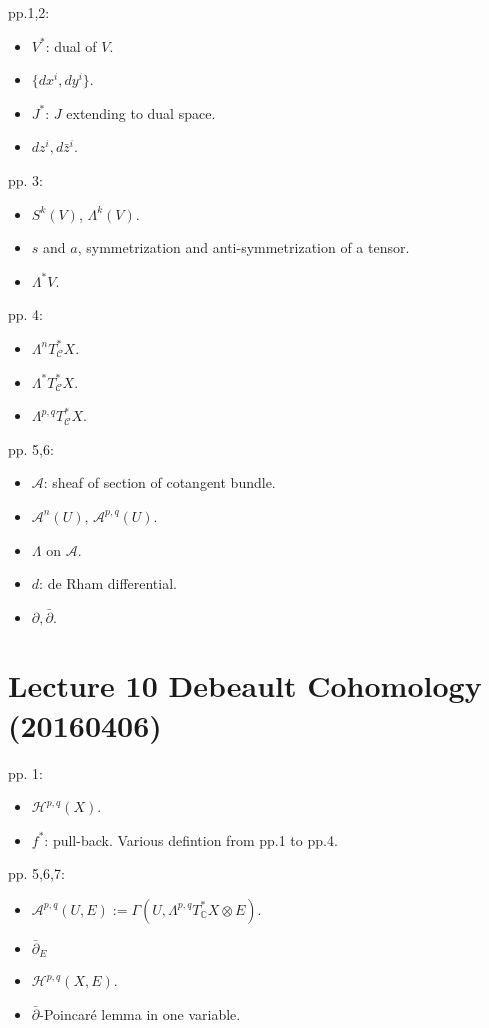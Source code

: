 pp.1,2:
\begin{itemize}
    \item $V^*$: dual of $V$.
    \item $\{dx^i,dy^i\}$.
    \item $J^*$: $J$ extending to dual space.
    \item $dz^i,d\bar{z}^i$.
\end{itemize}
pp. 3:
\begin{itemize}
    \item $S^k(V)$, $\Lambda^k(V)$.
    \item $s$ and $a$, symmetrization and anti-symmetrization of a tensor.
    \item $\Lambda^* V$.
\end{itemize}
pp. 4:
\begin{itemize}
    \item $\Lambda^n T^*_{\mathcal{C}}X$.
    \item $\Lambda^* T^*_{\mathcal{C}}X$.
    \item $\Lambda^{p,q} T^*_{\mathcal{C}}X$.
\end{itemize}
pp. 5,6:
\begin{itemize}
    \item $\mathcal{A}$: sheaf of section of cotangent bundle.
    \item $\mathcal{A}^n(U)$, $\mathcal{A}^{p,q}(U)$.
    \item $\Lambda$ on $\mathcal{A}$.
    \item $d$: de Rham differential.
    \item $\partial, \bar{\partial}$.
\end{itemize}
	
\section{Lecture 10 Debeault Cohomology (20160406)}

pp. 1:
\begin{itemize}
    \item $\mathcal{H}^{p,q}(X)$.
    \item $f^*$: pull-back. Various defintion from pp.1 to pp.4.
\end{itemize}
pp. 5,6,7:
\begin{itemize}
    \item $\mathcal{A}^{p,q}(U,E):=\Gamma(U,\Lambda^{p,q}T_{\mathbb{C}}^* X \otimes E)$.
    \item $\bar{\partial}_E$
    \item $\mathcal{H}^{p,q}(X,E)$.
    \item $\bar{\partial}$-Poincaré lemma in one variable.
\end{itemize}
	
